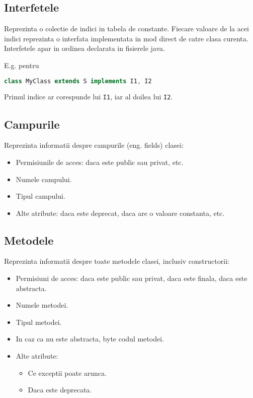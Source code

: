 \subsection{Interfetele}

Reprezinta o colectie de indici in tabela de constante. Fiecare valoare
de la acei indici reprezinta o interfata implementata in mod direct de
catre clasa curenta. Interfetele apar in ordinea declarata in fisierele
java.

E.g. pentru

\begin{lstlisting}[language=Java]
class MyClass extends S implements I1, I2
\end{lstlisting}

Primul indice ar corespunde lui \texttt{I1}, iar al doilea lui
\texttt{I2}.

\subsection{Campurile}\label{campurile}

Reprezinta informatii despre campurile (eng. fields) clasei:
\begin{itemize}
	\item Permisiunile de acces: daca este public sau privat, etc.
	\item Numele campului.
	\item Tipul campului.
	\item Alte atribute: daca este deprecat, daca are o valoare constanta, etc.
\end{itemize}

\subsection{Metodele}\label{metodele}

Reprezinta informatii despre toate metodele clasei, inclusiv
constructorii:

\begin{itemize}
	\item Permisiuni de acces: daca este public sau privat, daca este finala, daca este abstracta.
	\item Numele metodei.
	\item Tipul metodei.
	\item In caz ca nu este abstracta, byte codul metodei.
	\item Alte atribute:
	      \begin{itemize}
		      \item Ce exceptii poate arunca.
		      \item Daca este deprecata.
	      \end{itemize}
\end{itemize}

